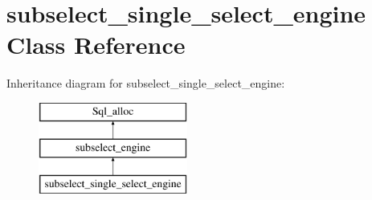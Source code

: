 \hypertarget{classsubselect__single__select__engine}{}\section{subselect\+\_\+single\+\_\+select\+\_\+engine Class Reference}
\label{classsubselect__single__select__engine}
Inheritance diagram for subselect\+\_\+single\+\_\+select\+\_\+engine\+:\begin{figure}[H]
\begin{center}
\leavevmode
\includegraphics[height=3.000000cm]{classsubselect__single__select__engine}
\end{center}
\end{figure}
